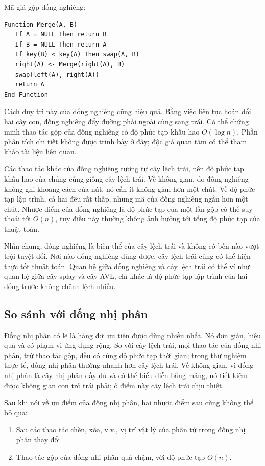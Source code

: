 \documentclass[11pt]{article}
\begin{document}
Mã giả gộp đống nghiêng:

\begin{verbatim}
Function Merge(A, B)
   If A = NULL Then return B
   If B = NULL Then return A
   If key(B) < key(A) Then swap(A, B)
   right(A) <- Merge(right(A), B)
   swap(left(A), right(A))
   return A
End Function
\end{verbatim}

Cách duy trì này của đống nghiêng cũng hiệu quả. Bằng việc liên tục hoán đổi
hai cây con, đống nghiêng đẩy đường phải ngoài cùng sang trái. Có thể chứng
minh thao tác gộp của đống nghiêng có độ phức tạp khấu hao \(O(\log n)\). Phần
phân tích chi tiết không được trình bày ở đây; độc giả quan tâm có thể tham
khảo tài liệu liên quan.

Các thao tác khác của đống nghiêng tương tự cây lệch trái, nên độ phức tạp khấu
hao của chúng cũng giống cây lệch trái. Về không gian, do đống nghiêng không ghi
khoảng cách của nút, nó cần ít không gian hơn một chút. Về độ phức tạp lập
trình, cả hai đều rất thấp, nhưng mã của đống nghiêng ngắn hơn một chút. Nhược
điểm của đống nghiêng là độ phức tạp của một lần gộp có thể suy thoái tới
\(O(n)\), tuy điều này thường không ảnh hưởng tới tổng độ phức tạp của thuật
toán.

Nhìn chung, đống nghiêng là biến thể của cây lệch trái và không có bên nào vượt
trội tuyệt đối. Nơi nào đống nghiêng dùng được, cây lệch trái cũng có thể hiện
thực tốt thuật toán. Quan hệ giữa đống nghiêng và cây lệch trái có thể ví như
quan hệ giữa cây splay và cây AVL, chỉ khác là độ phức tạp lập trình của hai
đống trước không chênh lệch nhiều.

\subsection{So sánh với đống nhị phân}

Đống nhị phân có lẽ là hàng đợi ưu tiên được dùng nhiều nhất. Nó đơn giản, hiệu
quả và có phạm vi ứng dụng rộng. So với cây lệch trái, mọi thao tác của đống
nhị phân, trừ thao tác gộp, đều có cùng độ phức tạp thời gian; trong thử nghiệm
thực tế, đống nhị phân thường nhanh hơn cây lệch trái. Về không gian, vì đống
nhị phân là cây nhị phân đầy đủ và có thể biểu diễn bằng mảng, nó tiết kiệm
được không gian con trỏ trái phải; ở điểm này cây lệch trái chịu thiệt.

Sau khi nói về ưu điểm của đống nhị phân, hai nhược điểm sau cũng không thể bỏ
qua:
\begin{enumerate}
  \item Sau các thao tác chèn, xóa, v.v., vị trí vật lý của phần tử trong đống
  nhị phân thay đổi.
  \item Thao tác gộp của đống nhị phân quá chậm, với độ phức tạp \(O(n)\).
\end{enumerate}
\end{document}
